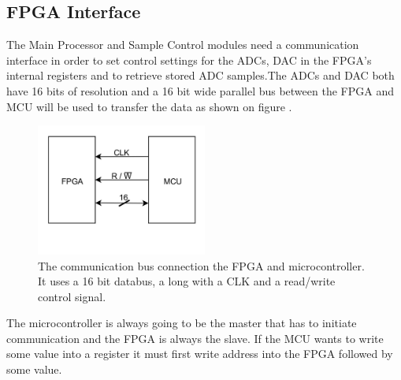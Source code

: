 \subsection{FPGA Interface} \label{subsec:FPGAInterface}
The Main Processor and Sample Control modules need a communication interface in order to set control settings for the ADCs, DAC in the FPGA's internal registers and to retrieve stored ADC samples.The ADCs and DAC  both have 16 bits of resolution and a 16 bit wide parallel bus between the FPGA and MCU will be used to transfer the data as shown on figure .

\begin{figure}[H]
    \centering
    \includegraphics[clip, trim=0 100 0 0, width=0.5\textwidth]{Sections/7_SystemDesign/Figures/7_2_1_CommunicationBus.pdf}
    \caption{The communication bus connection the FPGA and microcontroller. It uses a 16 bit databus, a long with a CLK and a read/write control signal.}
    \label{fig_7_2_1_CommBus}
\end{figure}

The microcontroller is always going to be the master that has to initiate communication and the FPGA is always the slave. If the MCU wants to write some value into a register it must first write address into the FPGA followed by some value.